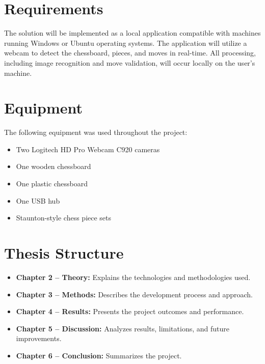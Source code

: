 \section{Requirements}

The solution will be implemented as a local application compatible with machines running Windows or Ubuntu operating systems. The application will utilize a webcam to detect the chessboard, pieces, and moves in real-time. All processing, including image recognition and move validation, will occur locally on the user's machine.

\section{Equipment}
The following equipment was used throughout the project:

\begin{itemize}
    \item Two Logitech HD Pro Webcam C920 cameras
    \item One wooden chessboard
    \item One plastic chessboard
    \item One USB hub
    \item Staunton-style chess piece sets
\end{itemize}


\section{Thesis Structure}

\begin{itemize}
    
    \item \textbf{Chapter 2 -- Theory:} Explains the technologies and methodologies used.
    
    \item \textbf{Chapter 3 -- Methods:} Describes the development process and approach.
    
    \item \textbf{Chapter 4 -- Results:} Presents the project outcomes and performance.
    
    \item \textbf{Chapter 5 -- Discussion:} Analyzes results, limitations, and future improvements.
    
    \item \textbf{Chapter 6 -- Conclusion:} Summarizes the project.


    
\end{itemize}